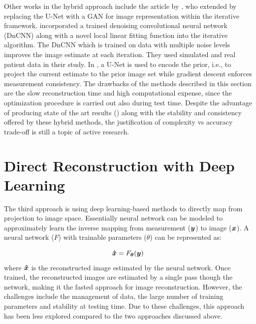 Other works in the hybrid approach include the article by \cite{xie2019generative}, who extended \cite{gong2019iterative} by replacing the U-Net with a \ac{GAN} for image representation within the iterative framework. \cite{kim2018penalized} incorporated a trained denoising convolutional neural network (DnCNN) along with a novel local linear fitting function into the iterative algorithm. The DnCNN which is trained on data with multiple noise levels improves the image estimate at each iteration. They used simulated and real patient data in their study. In \cite{gupta2018cnn}, a U-Net is used to encode the prior, i.e., to project the current estimate to the prior image set while gradient descent enforces measurement consistency. The drawbacks of the methods described in this section are the slow reconstruction time and high computational expense, since the optimization procedure is carried out also during test time. Despite the advantage of producing state of the art results (\cite{reader2020deep,leuschner2021quantitative}) along with the stability and consistency offered by these hybrid methods, the justification of complexity vs accuracy trade-off is still a topic of active research. 


\section{Direct Reconstruction with Deep Learning}

The third approach is using deep learning-based methods to directly map from projection to image space. Essentially neural network can be modeled to approximately learn  the inverse mapping from measurement ($\bm{y}$) to image ($\bm{x}$). A neural network ($F$) with trainable parameters ($\theta$) can be represented as:

\begin{equation}\label{eq:direct}
\bm{\hat{x}}=F_{\bm{\theta}}(\bm{y})
\end{equation}
where $\bm{\hat{x}}$ is the reconstructed image estimated by the neural network. Once trained, the reconstructed images are estimated by a single pass though the network, making it the fasted approach for image reconstruction. However, the challenges include the management of data, the large number of training parameters and stability at testing time. Due to these challenges, this approach has been less explored compared to the two approaches discussed above. 

